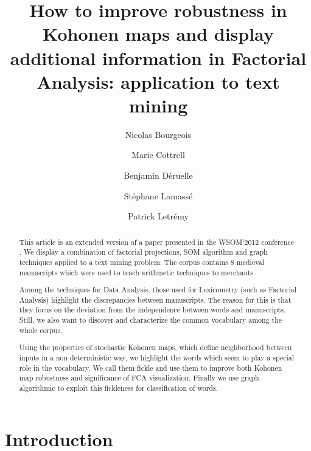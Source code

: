 \documentclass[preprint]{elsarticle}
\begin{document}
\begin{frontmatter}

\title{How to improve robustness in Kohonen maps and display additional information in Factorial Analysis: application to text mining}

\author[samm]{Nicolas Bourgeois}
\author[samm]{Marie Cottrell}
\author[lamop]{Benjamin D\'eruelle}
\author[lamop]{St\'ephane Lamass\'e}
\author[samm]{Patrick Letr\'emy}

\address[samm]{SAMM - Universit\'e Paris 1 Panth\'eon-Sorbonne 90, rue de Tolbiac, 75013 Paris, France \mailENS,\mailSAMM}
\address[lamop]{PIREH-LAMOP - Universit\'e Paris 1 Panth\'eon-Sorbonne 1, rue Victor Cousin, Paris, France \mailLAMOP}


\begin{abstract}
This article is an extended version of a paper presented in the WSOM'2012 conference \cite{wsom12}. We display a combination of factorial projections, SOM algorithm and graph techniques applied to a text mining problem. The corpus contains 8 medieval manuscripts which were used to teach arithmetic techniques to merchants. 

Among the techniques for Data Analysis, those used for Lexicometry (such as Factorial Analysis) highlight the discrepancies between manuscripts. The reason for this is that they focus on the deviation from the independence between words and manuscripts. Still, we also want to discover and characterize the common vocabulary among the whole corpus.

Using the properties of stochastic Kohonen maps, which define neighborhood between inputs in a non-deterministic way, we highlight the words which seem to play a special role in the vocabulary. We call them fickle and use them to improve both Kohonen map robustness and significance of FCA visualization. Finally we use graph algorithmic to exploit this fickleness for classification of words.
\end{abstract}

\end{frontmatter}

\section*{Introduction}
\setcounter{footnote}{0}
\end{document}
